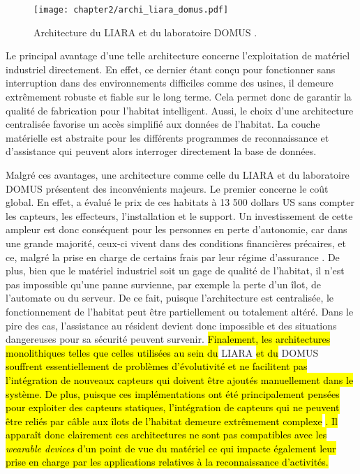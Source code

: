 \begin{figure}[H]
	\centering
	\texttt{[image: chapter2/archi\_liara\_domus.pdf]}
	\caption[Architecture du \acs{LIARA} et du laboratoire \acs{DOMUS}.]{Architecture du \acs{LIARA} \citep{Bouchard2014} et du laboratoire \acs{DOMUS} \citep{Giroux2009}.}
	\label{fig:archi_liara_domus}
\end{figure}

Le principal avantage d'une telle architecture concerne l'exploitation de matériel industriel directement. En effet, ce dernier étant conçu pour fonctionner sans interruption dans des environnements difficiles comme des usines, il demeure extrêmement robuste et fiable sur le long terme. Cela permet donc de garantir la qualité de fabrication pour l'habitat intelligent. Aussi, le choix d'une architecture centralisée favorise un accès simplifié aux données de l'habitat. La couche matérielle est abstraite pour les différents programmes de reconnaissance et d'assistance qui peuvent alors interroger directement la base de données.

Malgré ces avantages, une architecture comme celle du \acs{LIARA} et du laboratoire \acs{DOMUS} présentent des inconvénients majeurs. Le premier concerne le coût global. En effet, \cite{Plantevin2018a} a évalué le prix de ces habitats à 13 500 dollars US sans compter les capteurs, les effecteurs, l'installation et le support. Un investissement de cette ampleur est donc conséquent pour les personnes en perte d'autonomie, car dans une grande majorité, ceux-ci vivent dans des conditions financières précaires, et ce, malgré la prise en charge de certains frais par leur régime d'assurance \citep{AlzheimersAssociation2018}. De plus, bien que le matériel industriel soit un gage de qualité de l'habitat, il n'est pas impossible qu'une panne survienne, par exemple la perte d'un îlot, de l'automate ou du serveur. De ce fait, puisque l'architecture est centralisée, le fonctionnement de l'habitat peut être partiellement ou totalement altéré. Dans le pire des cas, l'assistance au résident devient donc impossible et des situations dangereuses pour sa sécurité peuvent survenir. \hl{Finalement, les architectures monolithiques telles que celles utilisées au sein du} \acs{LIARA} \hl{et du} \acs{DOMUS} \hl{souffrent essentiellement de problèmes d'évolutivité et ne facilitent pas l'intégration de nouveaux capteurs qui doivent être ajoutés manuellement dans le système. De plus, puisque ces implémentations ont été principalement pensées pour exploiter des capteurs statiques, l'intégration de capteurs qui ne peuvent être reliés par câble aux îlots de l'habitat demeure extrêmement complexe} \citep{Plantevin2018a}\hl{. Il apparaît donc clairement ces architectures ne sont pas compatibles avec les \textit{wearable devices} d'un point de vue du matériel ce qui impacte également leur prise en charge par les applications relatives à la reconnaissance d'activités.}

